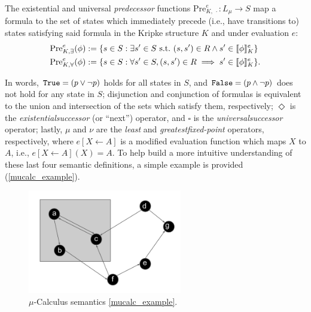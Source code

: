 \vspace*{2.2mm}
\noindent
The existential and universal {\em predecessor\/} functions $\text{Pre}_{K,\ \cdot}^e:L_\mu \to S$ map a \mucalc{} formula to the set of states which immediately precede (i.e., have transitions to) states satisfying said formula in the Kripke structure $K$ and under evaluation $e$:
\begin{align*}
    \Pree{\phi} &:= \{ s \in S : \exists s' \in S \ \text{s.t.} \ (s,s') \in R \land s' \in \brackets{\phi}_K^e\} \\
    \Prea{\phi} &:= \{ s \in S : \forall s' \in S, (s,s') \in R \implies s' \in \brackets{\phi}_K^e\}.
\end{align*}

In words, ${\texttt{True}}{} = (p \lor \lnot p)$ holds for all states in $S$, and ${\texttt{False}}{} = (p \land \lnot p)$ does not hold for any state in $S$; disjunction and conjunction of formulas is equivalent to the union and intersection of the sets which satisfy them, respectively; $\Diamond$ is the {\em existential\/successor} (or ``next'') operator, and $\square$ is the {\em universal\/successor} operator; lastly, $\mu$ and $\nu$ are the {\em least\/} and {\em greatest\/fixed-point} operators, respectively, where $e[X \leftarrow A]$ is a modified evaluation function which maps $X$ to $A$, i.e., $e[X \leftarrow A](X) = A$. To help build a more intuitive understanding of these last four semantic definitions, a simple example is provided (\autoref{mucalc_example}).

\begin{figure}[!hb]
    \centering
    \includegraphics[width=0.6\textwidth]{./figures/mucalc_example}
    \caption[$\mu$-Calculus semantics example]{$\mu$-Calculus semantics \autoref{mucalc_example}.}
\label{fig:mucalc_example}
\end{figure}

